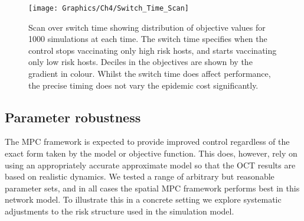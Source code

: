 \begin{figure}[h]
    \begin{center}
        \texttt{[image: Graphics/Ch4/Switch\_Time\_Scan]}
        \caption[Effect of switch time on strategy performance]{Scan over switch time showing distribution of objective values for 1000 simulations at each time. The switch time specifies when the control stops vaccinating only high risk hosts, and starts vaccinating only low risk hosts. Deciles in the objectives are shown by the gradient in colour. Whilst the switch time does affect performance, the precise timing does not vary the epidemic cost significantly.}
        \label{fig:ch4:switch_time_scan}
    \end{center}
\end{figure}

\FloatBarrier

\subsection{Parameter robustness\label{sec:ch4:Results_ParameterRobustness}}

The MPC framework is expected to provide improved control regardless of the exact form taken by the model or objective function. This does, however, rely on using an appropriately accurate approximate model so that the OCT results are based on realistic dynamics. We tested a range of arbitrary but reasonable parameter sets, and in all cases the spatial MPC framework performs best in this network model. To illustrate this in a concrete setting we explore systematic adjustments to the risk structure used in the simulation model.

